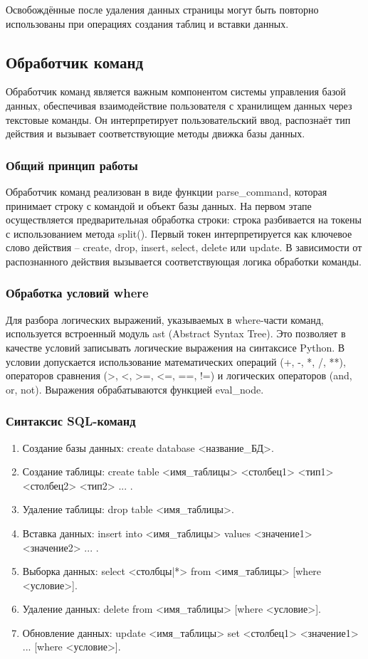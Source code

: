 Освобождённые после удаления данных страницы могут быть повторно использованы при операциях создания таблиц и вставки данных.

\subsection{Обработчик команд}

Обработчик команд является важным компонентом системы управления базой данных, обеспечивая взаимодействие пользователя с хранилищем данных через текстовые команды. Он интерпретирует пользовательский ввод, распознаёт тип действия и вызывает соответствующие методы движка базы данных. 

\subsubsection{Общий принцип работы}

Обработчик команд реализован в виде функции parse\_command, которая принимает строку с командой и объект базы данных. На первом этапе осуществляется предварительная обработка строки: строка разбивается на токены с использованием метода split(). Первый токен интерпретируется как ключевое слово действия -- create, drop, insert, select, delete или update. В зависимости от распознанного действия вызывается соответствующая логика обработки команды.

\subsubsection{Обработка условий where}

Для разбора логических выражений, указываемых в where-части команд, используется встроенный модуль ast (Abstract Syntax Tree). Это позволяет в качестве условий записывать логические выражения на синтаксисе Python. В условии допускается использование математических операций (+, -, *, /, **), операторов сравнения (>, <, >=, <=, ==, !=) и логических операторов (and, or, not). Выражения обрабатываются функцией eval\_node.

\subsubsection{Синтаксис SQL-команд}

\begin{enumerate}
	\item Создание базы данных: create database <название\_БД>.
	\item Создание таблицы: create table <имя\_таблицы> <столбец1> <тип1> <столбец2> <тип2> ... .
	\item Удаление таблицы: drop table <имя\_таблицы>.
	\item Вставка данных: insert into <имя\_таблицы> values <значение1> <значение2> ... .
	\item Выборка данных: select <столбцы|*> from <имя\_таблицы> [where <условие>].
	\item Удаление данных: delete from <имя\_таблицы> [where <условие>].
	\item Обновление данных: update <имя\_таблицы> set <столбец1> <значение1> ... [where <условие>].	
\end{enumerate}

